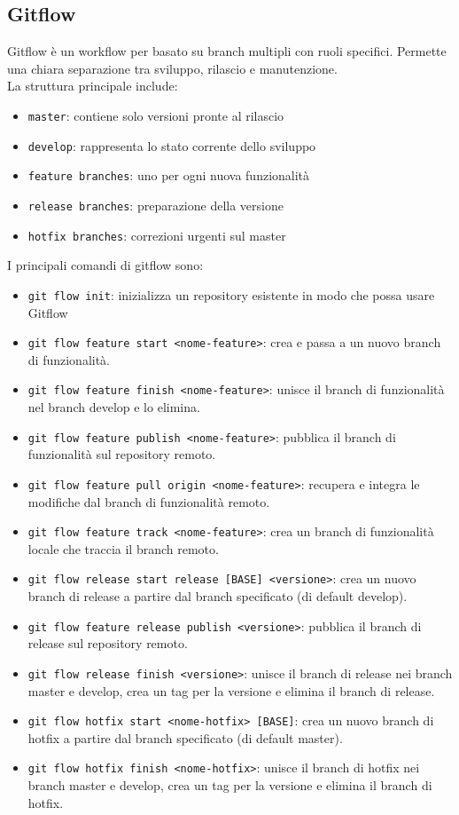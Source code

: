 \documentclass[a4paper, 11pt]{article}
\newcommand{\nocontentsline}[3]{}
\newcommand{\term}[1]{\vspace*{.5cm}\bgroup\let\addcontentsline=\nocontentsline\subsection{#1}\label{term:#1}\egroup}
\newcommand{\refterm}[1]{\nameref{term:#1}}
\begin{document}
\term{Gitflow}
Gitflow è un workflow per \refterm{Git} basato su branch multipli con ruoli specifici. Permette una chiara separazione tra sviluppo, rilascio e manutenzione.\\
La struttura principale include:
\begin{itemize}
	\item \texttt{master}: contiene solo versioni pronte al rilascio
	\item \texttt{develop}: rappresenta lo stato corrente dello sviluppo
	\item \texttt{feature branches}: uno per ogni nuova funzionalità
	\item \texttt{release branches}: preparazione della versione
	\item \texttt{hotfix branches}: correzioni urgenti sul master
\end{itemize}
I principali comandi di gitflow sono:
\begin{itemize}
	\item \texttt{git flow init}: inizializza un repository esistente in modo che possa usare Gitflow
	\item \texttt{git flow feature start <nome-feature>}: crea e passa a un nuovo branch di funzionalità.
	\item \texttt{git flow feature finish <nome-feature>}: unisce il branch di funzionalità nel branch develop e lo elimina.
	\item \texttt{git flow feature publish <nome-feature>}: pubblica il branch di funzionalità sul repository remoto.
	\item \texttt{git flow feature pull origin <nome-feature>}: recupera e integra le modifiche dal branch di funzionalità remoto.
	\item \texttt{git flow feature track <nome-feature>}: crea un branch di funzionalità locale che traccia il branch remoto.
	\item \texttt{git flow release start release [BASE] <versione>}: crea un nuovo branch di release a partire dal branch specificato (di default develop).
	\item \texttt{git flow feature release publish <versione>}: pubblica il branch di release sul repository remoto.
	\item \texttt{git flow release finish <versione>}: unisce il branch di release nei branch master e develop, crea un tag per la versione e elimina il branch di release.
	\item \texttt{git flow hotfix start <nome-hotfix> [BASE]}: crea un nuovo branch di hotfix a partire dal branch specificato (di default master).
	\item \texttt{git flow hotfix finish <nome-hotfix>}: unisce il branch di hotfix nei branch master e develop, crea un tag per la versione e elimina il branch di hotfix.
\end{itemize}
\end{document}
